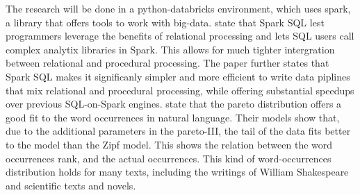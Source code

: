 \documentclass[../../Thesis.tex]{subfiles}
\begin{document}
The research will be done in a python-databricks environment, which uses spark, a library that offers tools to work with big-data. \citet{armburst2015} state that Spark SQL lest programmers leverage the benefits of relational processing and lets SQL users call complex analytix libraries in Spark. This allows for much tighter intergration between relational and procedural processing. The paper further states that Spark SQL makes it significanly simpler and more efficient to write data piplines that mix relational and procedural processing, while offering substantial speedups over previous SQL-on-Spark engines.
\citet{wiegand2018word} state that the pareto distribution offers a good fit to the word occurrences in natural language. Their models show that, due to the additional parameters in the pareto-III, the tail of the data fits better to the model than the Zipf model. This shows the relation between the word occurrences rank, and the actual occurrences. This kind of word-occurrences distribution holds for many texts, including the writings of William Shakespeare and scientific texts and novels\cite{thurner2015understanding}.
\end{document}
